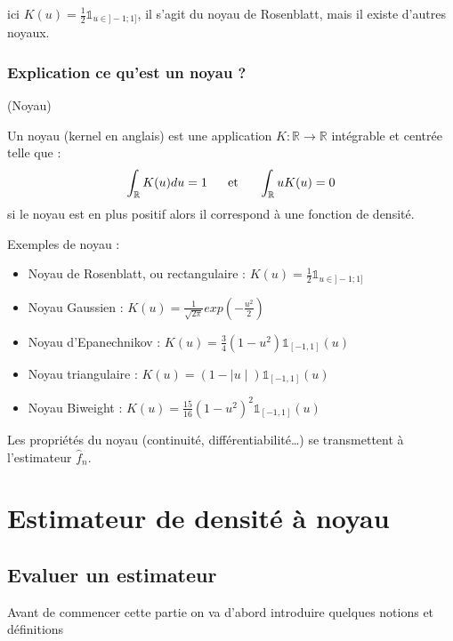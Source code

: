 \documentclass[
]{book}
\theoremstyle{definition}
\theoremstyle{definition}
\theoremstyle{definition}
\theoremstyle{definition}
\theoremstyle{remark}
\begin{document}
ici \(K(u)= \frac12 \mathds{1}_{u \in ]-1;1]}\), il s'agit du noyau de Rosenblatt, mais il existe d'autres noyaux.

\hypertarget{explication-ce-quest-un-noyau}{%
\subsection{Explication ce qu'est un noyau ?}\label{explication-ce-quest-un-noyau}}

\begin{dfn} (Noyau)  

Un noyau (kernel en anglais) est une application $K:\mathbb{R}\rightarrow\mathbb{R}$ intégrable et centrée telle que :
$$\int_{\mathbb R} K(u) du = 1 ~~~~ \hbox{ et } ~~~~ \int_{\mathbb R} u K(u)=0$$
si le noyau est en plus positif alors il correspond à une fonction de densité.
\end{dfn}

Exemples de noyau :

\begin{itemize}
\item
  Noyau de Rosenblatt, ou rectangulaire : \(K(u)= \frac12 \mathds{1}_{u\in]-1;1]}\)
\item
  Noyau Gaussien : \(K(u) =\frac1{\sqrt{2\pi}}exp(-\frac{u^2}2)\)
\item
  Noyau d'Epanechnikov : \(K(u) =\frac34(1-u^2)\mathds{1}_{[-1,1]}(u)\)
\item
  Noyau triangulaire : \(K(u) = (1-\mid u \mid)\mathds{1}_{[-1,1]}(u)\)
\item
  Noyau Biweight : \(K(u) = \frac{15}{16}(1-u^2)^2\mathds{1}_{[-1,1]}(u)\)
\end{itemize}

Les propriétés du noyau (continuité, différentiabilité\ldots) se transmettent à l'estimateur \(\hat f_n\).

\hypertarget{estimateur-de-densituxe9-uxe0-noyau}{%
\chapter{Estimateur de densité à noyau}\label{estimateur-de-densituxe9-uxe0-noyau}}

\hypertarget{evaluer-un-estimateur}{%
\section{Evaluer un estimateur}\label{evaluer-un-estimateur}}

Avant de commencer cette partie on va d'abord introduire quelques notions et définitions\newline
\end{document}
